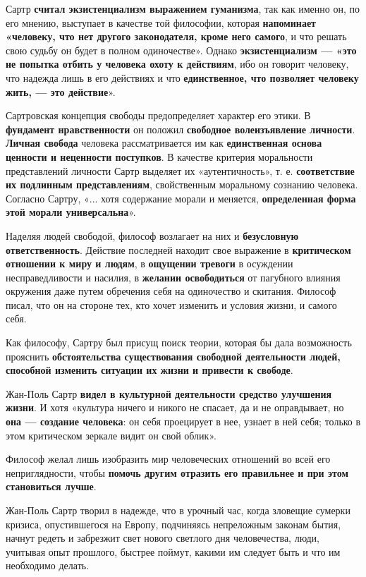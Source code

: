 \documentclass{article}
\begin{document}
\begin{flushleft}
\hfill

Сартр \textbf{считал экзистенциализм выражением гуманизма}, так как именно он, по его мнению, выступает в качестве той философии, которая \textbf{напоминает «человеку, что нет другого законодателя, кроме него самого}, и что решать свою судьбу он будет в полном одиночестве». Однако \textbf{экзистенциализм — «это не попытка отбить у человека охоту к действиям}, ибо он говорит человеку, что надежда лишь в его действиях и что \textbf{единственное, что позволяет человеку жить, — это действие}».

\hfill

Сартровская концепция свободы предопределяет характер его этики. В \textbf{фундамент нравственности} он положил \textbf{свободное волеизъявление личности}. \textbf{Личная свобода} человека рассматривается им как \textbf{единственная основа ценности и неценности поступков}. В качестве критерия моральности представлений личности Сартр выделяет их «аутентичность», т. е. \textbf{соответствие их подлинным представлениям}, свойственным моральному сознанию человека. Согласно Сартру, «... хотя содержание морали и меняется, \textbf{определенная форма этой морали универсальна}».

\hfill

Наделяя людей свободой, философ возлагает на них и \textbf{безусловную ответственность}. Действие последней находит свое выражение в \textbf{критическом отношении к миру и людям}, в \textbf{ощущении тревоги} в осуждении несправедливости и насилия, в \textbf{желании освободиться} от пагубного влияния окружения даже путем обречения себя на одиночество и скитания. Философ писал, что он на стороне тех, кто хочет изменить и условия жизни, и самого себя.

\hfill

Как философу, Сартру был присущ поиск теории, которая бы дала возможность прояснить \textbf{обстоятельства существования свободной деятельности людей, способной изменить ситуации их жизни и привести к свободе}.

\hfill

Жан-Поль Сартр \textbf{видел в культурной деятельности средство улучшения жизни}. И хотя «культура ничего и никого не спасает, да и не оправдывает, но \textbf{она — создание человека}: он себя проецирует в нее, узнает в ней себя; только в этом критическом зеркале видит он свой облик». 

Философ желал лишь изобразить мир человеческих отношений во всей его неприглядности, чтобы \textbf{помочь другим отразить его правильнее и при этом становиться лучше}.

Жан-Поль Сартр творил в надежде, что в урочный час, когда зловещие сумерки кризиса, опустившегося на Европу, подчиняясь непреложным законам бытия, начнут редеть и забрезжит свет нового светлого дня человечества, люди, учитывая опыт прошлого, быстрее поймут, какими им следует быть и что им необходимо делать.

\end{flushleft}
\end{document}
